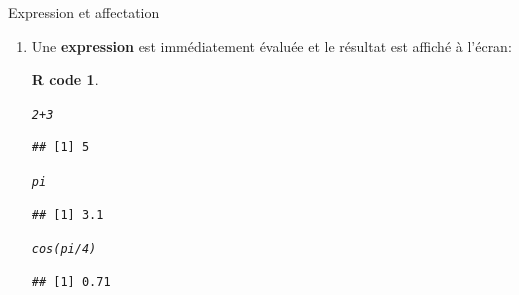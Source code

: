 \documentclass[11pt]{beamer}\usepackage[]{graphicx}\usepackage[]{color}
\makeatletter
\newcommand{\hlnum}[1]{\textcolor[rgb]{0.063,0.58,0.627}{#1}}%
\newcommand{\hlopt}[1]{\textcolor[rgb]{0.196,0.196,0.196}{#1}}%
\newcommand{\hlstd}[1]{\textcolor[rgb]{0.196,0.196,0.196}{#1}}%
\newcommand{\hlkwd}[1]{\textcolor[rgb]{0.78,0.227,0.412}{#1}}%
\newenvironment{kframe}{%
 \def\at@end@of@kframe{}%
 \ifinner\ifhmode%
  \def\at@end@of@kframe{\end{minipage}}%
  \begin{minipage}{\columnwidth}%
 \fi\fi%
 \def\FrameCommand##1{\hskip\@totalleftmargin \hskip-\fboxsep
 \colorbox{shadecolor}{##1}\hskip-\fboxsep
     \hskip-\linewidth \hskip-\@totalleftmargin \hskip\columnwidth}%
 \MakeFramed {\advance\hsize-\width
   \@totalleftmargin\z@ \linewidth\hsize
   \@setminipage}}%
 {\par\unskip\endMakeFramed%
 \at@end@of@kframe}
\newenvironment{knitrout}{}{} %
\newtheorem{rcode}{R code}[section]
\newcounter{saveenumi}
\newcommand{\seti}{\setcounter{saveenumi}{\value{enumi}}}
\makeatother
\begin{document}
\begin{frame}[fragile]{Expression et affectation} 
\begin{enumerate}
\item Une \textbf{expression} est immédiatement évaluée et le résultat est affiché à l’écran:
\pause
\begin{knitrout}
\color{fgcolor}\begin{kframe}
\begin{rcode}\label{unnamed-chunk-22}\begin{alltt}
\hlnum{2} \hlopt{+} \hlnum{3}
\end{alltt}
\begin{verbatim}
## [1] 5
\end{verbatim}
\begin{alltt}
\hlstd{pi}
\end{alltt}
\begin{verbatim}
## [1] 3.1
\end{verbatim}
\begin{alltt}
\hlkwd{cos}\hlstd{(pi}\hlopt{/}\hlnum{4}\hlstd{)}
\end{alltt}
\begin{verbatim}
## [1] 0.71
\end{verbatim}
\end{rcode}\end{kframe}
\end{knitrout}
\seti
\end{enumerate}

\end{frame}
\end{document}

